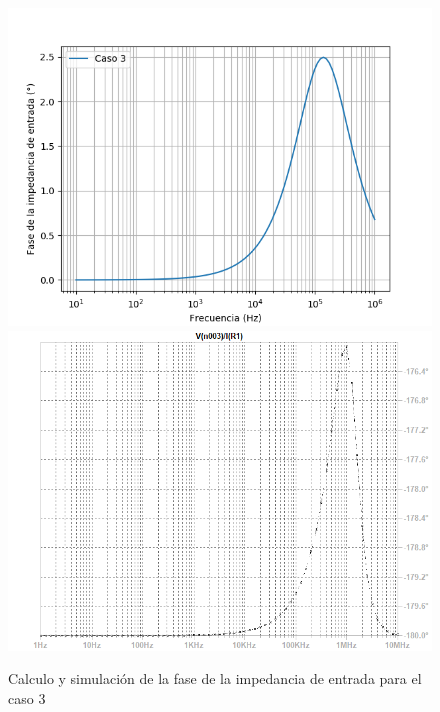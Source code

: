 \begin{figure}[H]
\begin{centering}
\includegraphics[scale=0.5]{../Ex1/iA/Resources1a/zinpp3}\includegraphics[scale=0.4]{../Ex1/iA/Resources1a/zinpp3_sim}
\par\end{centering}
\caption{Calculo y simulación de la fase de la impedancia de entrada para el
caso 3}
\end{figure}

